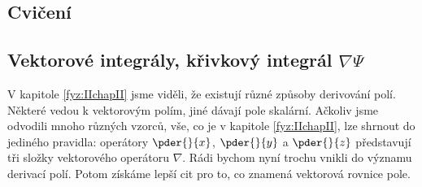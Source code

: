     \subsection{Cvičení}\label{fyz:IIchapIIsecIX}
      
      
      
    \subsection{Vektorové integrály, křivkový integrál \texorpdfstring{\(\nabla\Psi\)}{nabla 
    psi}}\label{fyz:IIchapIIIsecI}
      V kapitole \ref{fyz:IIchapII} jsme viděli, že existují různé způsoby derivování polí. Některé 
      vedou k vektorovým polím, jiné dávají pole skalární. Ačkoliv jsme odvodili mnoho různých 
      vzorců, vše, co je v kapitole \ref{fyz:IIchapII}, lze shrnout do jediného pravidla: operátory 
      \(\pder{ }{x}\), \(\pder{ }{y}\) a \(\pder{ }{z}\) představují tři složky vektorového operátoru 
      \(\nabla\). Rádi bychom nyní trochu vnikli do významu derivací polí. Potom získáme lepší cit 
      pro to, co znamená vektorová rovnice pole.
      
